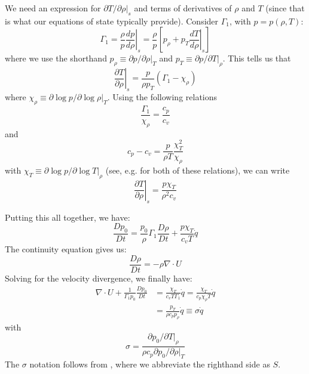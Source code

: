 We need an expression for $\partial T/\partial \rho |_s$ and terms of
derivatives of $\rho$ and $T$ (since that is what our equations of
state typically provide).  Consider $\Gamma_1$, with $p = p(\rho, T)$:
\begin{equation}
  \Gamma_1 = \frac{\rho}{p} \left . \frac{dp}{d\rho} \right |_s
  = \frac{\rho}{p} \left [ p_\rho + p_T \left . \frac{dT}{d\rho} \right |_s \right ]
\end{equation}
where we use the shorthand $p_\rho \equiv \partial p/\partial \rho |_T$ and
$p_T \equiv \partial p/\partial T |_\rho$.  This tells us that
\begin{equation}
  \left . \frac{\partial T}{\partial \rho} \right |_s = \frac{p}{\rho p_T} (\Gamma_1 - \chi_\rho)
\end{equation}
where $\chi_\rho \equiv \partial \log p / \partial \log \rho |_T$.  Using the following
relations
\begin{equation}
\frac{\Gamma_1}{\chi_\rho} = \frac{c_p}{c_v}
\end{equation}
and
\begin{equation}
  c_p - c_v = \frac{p}{\rho T} \frac{\chi_T^2}{\chi_\rho}
\end{equation}
with $\chi_T \equiv \partial \log p / \partial \log T |_\rho$
(see, e.g. \cite{HKT} for both of these relations), we can
write
\begin{equation}
  \left . \frac{\partial T}{\partial \rho} \right |_s = \frac{p\chi_T}{\rho^2 c_v}
\end{equation}

Putting this all together, we have:
\begin{equation}
\frac{Dp_0}{Dt} = \frac{p_0}{\rho}\Gamma_1  \frac{D\rho}{Dt}
   + \frac{p \chi_T}{c_v T} \dot{q}
\end{equation}
The continuity equation gives us:
\begin{equation}
\frac{D\rho}{Dt} = -\rho \nabla \cdot U
\end{equation}
Solving for the velocity divergence, 
we finally have:
\begin{align}
  \nabla \cdot U + \frac{1}{\Gamma_1 p_0}\frac{Dp_0}{Dt} &=
    \frac{\chi_T }{c_v T \Gamma_1} \dot{q} 
  = \frac{\chi_T}{c_p \chi_\rho T} \dot{q} \nonumber \\
 &= \frac{p_T}{\rho c_p p_\rho} \dot{q}
  \equiv \sigma \dot{q}    
\end{align}
with
\begin{equation}
\sigma = \frac{\partial p_0/\partial T |_\rho}{\rho c_p \partial p_0/\partial \rho |_T}
\end{equation}
The $\sigma$ notation follows from \cite{ABRZ:II}, where we abbreviate
the righthand side as $S$.

